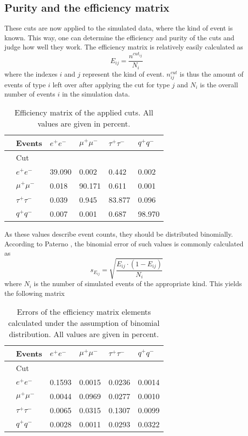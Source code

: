 \subsection{Purity and the efficiency matrix}
These cuts are now applied to the simulated data, where the kind of event is known. This way, one can determine the efficiency and purity of the cuts and judge how well they work. 
The efficiency matrix is relatively easily calculated as
\begin{equation}
E_{ij}=\frac{n^{cut_{ij}}}{N_i}
\end{equation}
where the indexes $i$ and $j$ represent the kind of event. $n^{cut}_{ij}$ is thus the amount of events of type $i$ left over after applying the cut for type $j$ and $N_i$ is the overall number of events $i$ in the simulation data.
\begin{table}[H]\centering
	\begin{tabular}{@{}llllll@{}}
		\toprule
		&Events &$e^+e^-$&$\mu^+\mu^-$&$\tau^+\tau^-$&$q^+q^-$\\
		\midrule
		&Cut&&&&\\
		&$e^+e^-$&39.090&0.002&0.442&0.002\\
		&$\mu^+\mu^-$&0.018&90.171&0.611&0.001\\
		&$\tau^+\tau^-$&0.039&0.945&83.877&0.096\\
		&$q^+q^-$&0.007&0.001&0.687&98.970\\
		\bottomrule
	\end{tabular}
	\caption[Efficiency matrix]{Efficiency matrix of the applied cuts. All values are given in percent.}
	\label{tb:efficiency}
\end{table}

As these values describe event counts, they should be distributed binomially. According to Paterno \cite{binpaper}, the binomial error of such values is commonly calculated as
\begin{equation}
s_{E_{ij}}=\sqrt{\frac{E_{ij}\cdot(1-E_{ij})}{N_i}}
\end{equation}
where $N_i$ is the number of simulated events of the appropriate kind. This yields the following matrix

\begin{table}[H]\centering
	\begin{tabular}{@{}llllll@{}}
		\toprule
		&Events &$e^+e^-$&$\mu^+\mu^-$&$\tau^+\tau^-$&$q^+q^-$\\
		\midrule
		&Cut&&&&\\
		&$e^+e^-$&0.1593&0.0015&0.0236&0.0014\\
		&$\mu^+\mu^-$&0.0044&0.0969&0.0277&0.0010\\
		&$\tau^+\tau^-$&0.0065&0.0315&0.1307&0.0099\\
		&$q^+q^-$&0.0028&0.0011&0.0293&0.0322\\
		\bottomrule
	\end{tabular}
	\caption[Efficiency error matrix]{Errors of the efficiency matrix elements calculated under the assumption of binomial distribution. All values are given in percent.}
	\label{tb:efficiencyerr}
\end{table}

